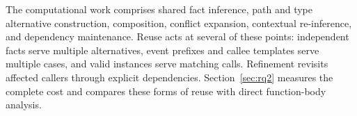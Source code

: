 The computational work comprises shared fact inference, path and type
alternative construction, composition, conflict expansion, contextual
re-inference, and dependency maintenance. Reuse acts at several of these
points: independent facts serve multiple alternatives, event prefixes and
callee templates serve multiple cases, and valid instances serve matching
calls. Refinement revisits affected callers through explicit dependencies.
Section~\ref{sec:rq2} measures the complete cost and compares these forms
of reuse with direct function-body analysis.
